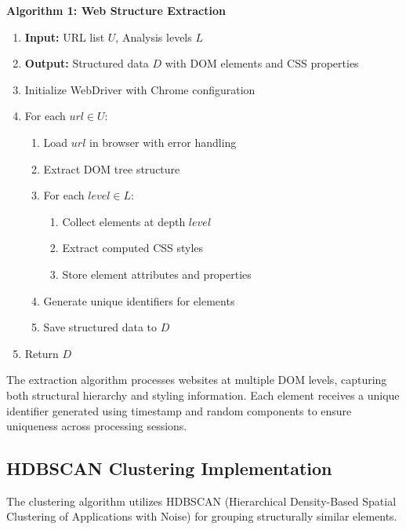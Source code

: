 \textbf{Algorithm 1: Web Structure Extraction}
\begin{enumerate}
\item \textbf{Input:} URL list $U$, Analysis levels $L$
\item \textbf{Output:} Structured data $D$ with DOM elements and CSS properties
\item Initialize WebDriver with Chrome configuration
\item For each $url \in U$:
\begin{enumerate}
    \item Load $url$ in browser with error handling
    \item Extract DOM tree structure
    \item For each $level \in L$:
    \begin{enumerate}
        \item Collect elements at depth $level$
        \item Extract computed CSS styles
        \item Store element attributes and properties
    \end{enumerate}
    \item Generate unique identifiers for elements
    \item Save structured data to $D$
\end{enumerate}
\item Return $D$
\end{enumerate}

The extraction algorithm processes websites at multiple DOM levels, capturing both structural hierarchy and styling information. Each element receives a unique identifier generated using timestamp and random components to ensure uniqueness across processing sessions.

\subsection{HDBSCAN Clustering Implementation}

The clustering algorithm utilizes HDBSCAN (Hierarchical Density-Based Spatial Clustering of Applications with Noise) for grouping structurally similar elements.


